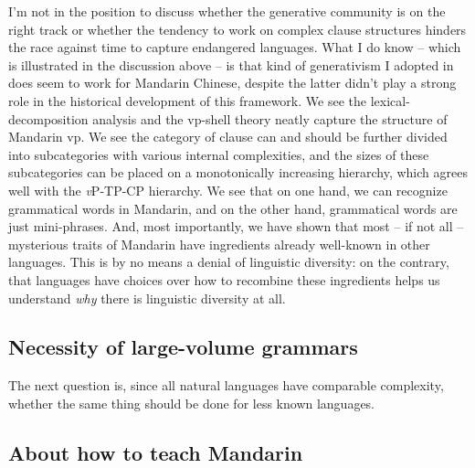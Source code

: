 \documentclass[UTF8, a4paper, oneside, scheme=plain, 12pt]{ctexrep}
\newcommand{\vP}{\textit{v}P}
\begin{document}
I'm not in the position to discuss whether the generative community 
is on the right track 
or whether the tendency to work on complex clause structures 
hinders the race against time to capture 
endangered languages.
What I do know -- which is illustrated in the discussion above -- 
is that kind of generativism I adopted in 
does seem to work for Mandarin Chinese, 
despite the latter didn't play a strong role 
in the historical development of this framework.
We see the lexical-decomposition analysis 
and the \acs{vp}-shell theory 
neatly capture the structure of Mandarin \acs{vp}.
We see the category of clause can and should be 
further divided into subcategories with various internal complexities,
and the sizes of these subcategories can be placed on 
a monotonically increasing hierarchy,
which agrees well with the \vP-TP-CP hierarchy.
We see that on one hand, 
we can recognize grammatical words in Mandarin, 
and on the other hand, 
grammatical words are just mini-phrases.
And, most importantly, we have shown that most -- if not all -- mysterious traits 
of Mandarin have ingredients already well-known in other languages.
This is by no means a denial of linguistic diversity: 
on the contrary, 
that languages have choices over how to recombine these ingredients
helps us understand \emph{why} there is linguistic diversity at all.

\subsection{Necessity of large-volume grammars}

The next question is, 
since all natural languages have comparable complexity, 
whether the same thing should be done for less known languages.

\subsection{About how to teach Mandarin}

\printbibliography[title=References]
\end{document}

